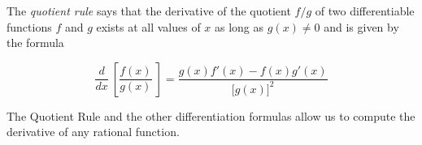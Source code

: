 \documentclass[12pt]{article}
\begin{document}
The \emph{quotient rule} says that the derivative of the quotient \(f/g\) of two differentiable functions \(f\) and \(g\) exists at all values of \(x\) as long as \(g(x) \not= 0\) and is given by the formula

\begin{equation*}
\frac{d}{dx}\ \left[\frac{f(x)}{g(x)}\ \right] = 
\frac{g(x)f'(x) - f(x)g'(x)}{\lbrack g(x) \rbrack ^2} 
\end{equation*}


The Quotient Rule and the other differentiation formulas allow us to compute the derivative of any rational function.
\end{document}
